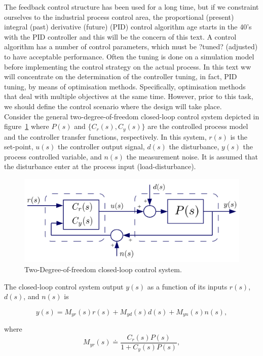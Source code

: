 The feedback control structure has been used for a long time, but if we constraint ourselves to the industrial process control area, the proportional (present) integral (past) derivative (future) (PID) control algorithm age starts in the 40's  with the PID controller and this will be the concern of this text.  A control algorithm has a number of control parameters, which must be ?tuned? (adjusted) to have acceptable performance. Often the tuning is done on a simulation model before implementing the control strategy on the actual process. In this text ww will concentrate on the determination of the controller tuning, in fact, PID tuning, by means of optimisation methods. Specifically, optimisation methods that deal with multiple objectives at the same time. However, prior to this task, we should define the control scenario where the design will take place.\\

Consider the general two-degree-of-freedom closed-loop control system depicted in figure~\ref{fig:bdg} where $P(s)$ and $\{C_r(s), C_y(s)\}$ are the controlled process model and the controller transfer functions, respectively.  In this system, $r(s)$ is the set-point, $u(s)$ the controller output signal, $d(s)$ the disturbance, $y(s)$ the process controlled variable, and $n(s)$ the measurement noise. It is assumed that the disturbance enter at the process input (load-disturbance).

\begin{figure}[tb]
\centering
	\includegraphics[width=0.80\linewidth]{../figuras/mrt_bdgen} 
\caption{Two-Degree-of-freedom closed-loop control system.} \label{fig:bdg}
\end{figure}


The closed-loop control system output $y(s)$ as a function of its inputs $r(s)$, $d(s)$, and $n(s)$ is

\begin{equation}
	y(s) = M_{yr}(s) r(s) + M_{yd}(s) d(s) + M_{yn}(s) n(s), \label{eq:yt}
\end{equation}

\noindent where
\begin{equation}
	M_{yr}(s) \doteq \frac{C_r(s)P(s)}{1+C_y(s)P(s)}, \label{eq:myr}
\end{equation}

